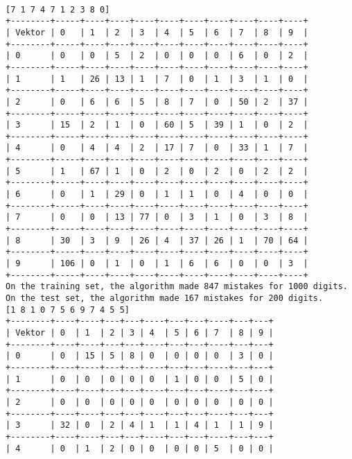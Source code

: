 \documentclass{article}
\begin{document}
\paragraph{}


\begin{lstlisting}[title=Beispielausgabe]
[7 1 7 4 7 1 2 3 8 0]
+--------+-----+----+----+----+----+----+----+----+----+----+
| Vektor | 0   | 1  | 2  | 3  | 4  | 5  | 6  | 7  | 8  | 9  |
+--------+-----+----+----+----+----+----+----+----+----+----+
| 0      | 0   | 0  | 5  | 2  | 0  | 0  | 0  | 6  | 0  | 2  |
+--------+-----+----+----+----+----+----+----+----+----+----+
| 1      | 1   | 26 | 13 | 1  | 7  | 0  | 1  | 3  | 1  | 0  |
+--------+-----+----+----+----+----+----+----+----+----+----+
| 2      | 0   | 6  | 6  | 5  | 8  | 7  | 0  | 50 | 2  | 37 |
+--------+-----+----+----+----+----+----+----+----+----+----+
| 3      | 15  | 2  | 1  | 0  | 60 | 5  | 39 | 1  | 0  | 2  |
+--------+-----+----+----+----+----+----+----+----+----+----+
| 4      | 0   | 4  | 4  | 2  | 17 | 7  | 0  | 33 | 1  | 7  |
+--------+-----+----+----+----+----+----+----+----+----+----+
| 5      | 1   | 67 | 1  | 0  | 2  | 0  | 2  | 0  | 2  | 2  |
+--------+-----+----+----+----+----+----+----+----+----+----+
| 6      | 0   | 1  | 29 | 0  | 1  | 1  | 0  | 4  | 0  | 0  |
+--------+-----+----+----+----+----+----+----+----+----+----+
| 7      | 0   | 0  | 13 | 77 | 0  | 3  | 1  | 0  | 3  | 8  |
+--------+-----+----+----+----+----+----+----+----+----+----+
| 8      | 30  | 3  | 9  | 26 | 4  | 37 | 26 | 1  | 70 | 64 |
+--------+-----+----+----+----+----+----+----+----+----+----+
| 9      | 106 | 0  | 1  | 0  | 1  | 6  | 6  | 0  | 0  | 3  |
+--------+-----+----+----+----+----+----+----+----+----+----+
On the training set, the algorithm made 847 mistakes for 1000 digits.
On the test set, the algorithm made 167 mistakes for 200 digits.
[1 8 1 0 7 5 6 9 7 4 5 5]
+--------+----+----+---+---+----+---+---+----+---+---+
| Vektor | 0  | 1  | 2 | 3 | 4  | 5 | 6 | 7  | 8 | 9 |
+--------+----+----+---+---+----+---+---+----+---+---+
| 0      | 0  | 15 | 5 | 8 | 0  | 0 | 0 | 0  | 3 | 0 |
+--------+----+----+---+---+----+---+---+----+---+---+
| 1      | 0  | 0  | 0 | 0 | 0  | 1 | 0 | 0  | 5 | 0 |
+--------+----+----+---+---+----+---+---+----+---+---+
| 2      | 0  | 0  | 0 | 0 | 0  | 0 | 0 | 0  | 0 | 0 |
+--------+----+----+---+---+----+---+---+----+---+---+
| 3      | 32 | 0  | 2 | 4 | 1  | 1 | 4 | 1  | 1 | 9 |
+--------+----+----+---+---+----+---+---+----+---+---+
| 4      | 0  | 1  | 2 | 0 | 0  | 0 | 0 | 5  | 0 | 0 |

\end{lstlisting}
\end{document}
